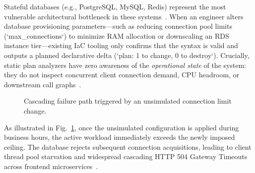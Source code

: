 \documentclass[conference]{IEEEtran}
\begin{document}
Stateful databases (e.g., PostgreSQL, MySQL, Redis) represent the most vulnerable architectural bottleneck in these systems~\cite{vanaken2017automatic}. When an engineer alters database provisioning parameters---such as reducing connection pool limits (`max_connections`) to minimize RAM allocation or downscaling an RDS instance tier---existing IaC tooling only confirms that the syntax is valid and outputs a planned declarative delta (`plan: 1 to change, 0 to destroy`). Crucially, static plan analyzers have zero awareness of the \textit{operational state} of the system: they do not inspect concurrent client connection demand, CPU headroom, or downstream call graphs~\cite{sharma2016drift}.

\begin{figure}[t]
\centering
{}
\caption{Cascading failure path triggered by an unsimulated connection limit change.}
\label{fig:motivating_incident}
\vspace{-1.2em}
\end{figure}

As illustrated in Fig.~\ref{fig:motivating_incident}, once the unsimulated configuration is applied during business hours, the active workload immediately exceeds the newly imposed ceiling. The database rejects subsequent connection acquisitions, leading to client thread pool starvation and widespread cascading HTTP 504 Gateway Timeouts across frontend microservices~\cite{beyer2016site}.
\end{document}
